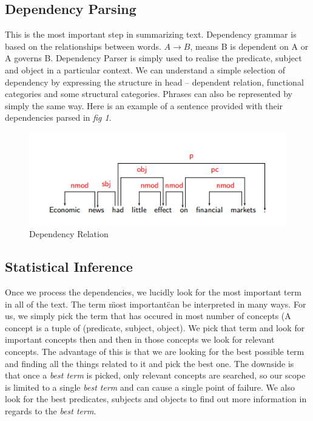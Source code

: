 \documentclass[conference]{IEEEtran}
\begin{document}
\subsection{Dependency Parsing}
This is the most important step in summarizing text. Dependency grammar is based on the relationships between words. $A \rightarrow B$, means B is dependent on A or A governs B. Dependency Parser is simply used to realise the predicate, subject and object in a particular context. We can understand a simple selection of dependency by expressing the structure in head -- dependent relation, functional categories and some structural categories. Phrases can also be represented by simply the same way. Here is an example of a sentence provided with their dependencies parsed in \textit{fig 1}.

\begin{figure}[h!]
\centering
\includegraphics[scale=0.4]{image1}
\caption{Dependency Relation}
    \label{fig:image1}
\end{figure}

\subsection{Statistical Inference}
Once we process the dependencies, we lucidly look for the most important term in all of the text. The term \"most important\" can be interpreted in many ways. For us, we simply pick the term that has occured in most number of concepts (A concept is a tuple of (predicate, subject, object). We pick that term and look for important concepts then and then in those concepts we look for relevant concepts. The advantage of this is that we are looking for the best possible term and finding all the things related to it and pick the best one. The downside is that once a \textit{best term} is picked, only relevant concepts are searched, so our scope is limited to a single \textit{best term} and can cause a single point of failure. We also look for the best predicates, subjects and objects to find out more information in regards to the \textit{best term}.
\end{document}
